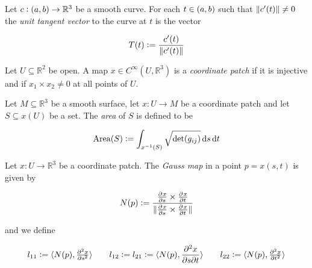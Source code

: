 \vspace{1mm}

\begin{definition}
	Let $c: \intoo{a,b} \to \mathbb{R}^3$ be a smooth curve. For each $t \in \intoo{a,b}$ such that $\norm[0]{c'(t)} \neq 0$ the \emph{unit tangent vector} to the curve at $t$ is the vector 

	\begin{equation}
		T(t) := \frac{c'(t)}{\norm[0]{c'(t)}}
	\end{equation}
\end{definition}

\vspace{1mm}

\begin{definition}
	Let $U \subseteq \mathbb{R}^2$ be open. A map $x \in C^\infty(U, \mathbb{R}^3)$ is a \emph{coordinate patch} if it is injective and if $x_1 \times x_2 \neq 0$ at all points of $U$. 
\end{definition}

\vspace{1mm}

\begin{definition}
	Let $M \subseteq \mathbb{R}^3$ be a smooth surface, let $x: U \to M$ be a coordinate patch and let $S \subseteq x(U)$ be a set. The \emph{area} of $S$ is defined to be

	\begin{equation}
		\operatorname{Area}(S) := \int_{x^{-1}(S)} \sqrt{\det(g_{ij})} \mathop{}\!\mathrm{d} s \mathop{}\!\mathrm{d} t
	\end{equation}
\end{definition}

\vspace{1mm}

Let $x: U \to \mathbb{R}^3$ be a coordinate patch. The \emph{Gauss map} in a point $p = x(s,t)$ is given by 

\begin{equation}
	N(p) := \frac{\pd{x}{s} \times \pd{x}{t}}{\norm[0]{\pd{x}{s} \times \pd{x}{t}}} 
\end{equation}

and we define

\begin{equation}
	l_{11} := \langle N(p), \pd[2]{x}{s} \rangle \qquad l_{12} := l_{21} := \langle N(p), \frac{\partial^2 x}{\partial s\partial t}\rangle \qquad 	l_{22} := \langle N(p), \pd[2]{x}{t} \rangle 
\end{equation}

\vspace{1mm}

